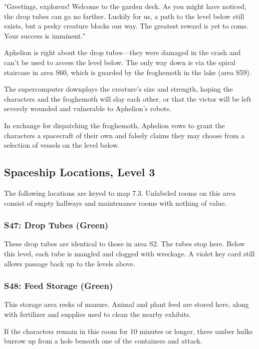\documentclass[10pt,a4paper,twoside,bg=print,twocolumn,openany,nodeprecatedcode]{dndbook}
\begin{document}
\begin{DndReadAloud}{}
"Greetings, explorers! Welcome to the garden deck. As you might have noticed, the drop tubes can go no farther. Luckily for us, a path to the level below still exists, but a pesky creature blocks our way. The greatest reward is yet to come. Your success is imminent."

\end{DndReadAloud}

Aphelion is right about the drop tubes—they were damaged in the crash and can't be used to access the level below. The only way down is via the spiral staircase in area S60, which is guarded by the froghemoth in the lake (area S59).

The supercomputer downplays the creature's size and strength, hoping the characters and the froghemoth will slay each other, or that the victor will be left severely wounded and vulnerable to Aphelion's robots.

In exchange for dispatching the froghemoth, Aphelion vows to grant the characters a spacecraft of their own and falsely claims they may choose from a selection of vessels on the level below.

\subsection{Spaceship Locations, Level 3}
The following locations are keyed to map 7.3. Unlabeled rooms on this area consist of empty hallways and maintenance rooms with nothing of value.

\subsubsection{S47: Drop Tubes (Green)}
These drop tubes are identical to those in area S2. The tubes stop here. Below this level, each tube is mangled and clogged with wreckage. A violet key card still allows passage back up to the levels above.

\subsubsection{S48: Feed Storage (Green)}
This storage area reeks of manure. Animal and plant feed are stored here, along with fertilizer and supplies used to clean the nearby exhibits.

If the characters remain in this room for 10 minutes or longer, three umber hulks burrow up from a hole beneath one of the containers and attack.
\end{document}
